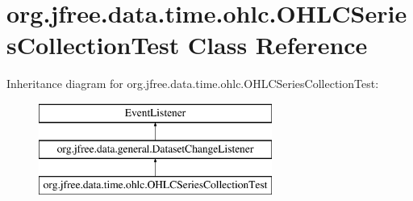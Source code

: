 \hypertarget{classorg_1_1jfree_1_1data_1_1time_1_1ohlc_1_1_o_h_l_c_series_collection_test}{}\section{org.\+jfree.\+data.\+time.\+ohlc.\+O\+H\+L\+C\+Series\+Collection\+Test Class Reference}
\label{classorg_1_1jfree_1_1data_1_1time_1_1ohlc_1_1_o_h_l_c_series_collection_test}
Inheritance diagram for org.\+jfree.\+data.\+time.\+ohlc.\+O\+H\+L\+C\+Series\+Collection\+Test\+:\begin{figure}[H]
\begin{center}
\leavevmode
\includegraphics[height=3.000000cm]{classorg_1_1jfree_1_1data_1_1time_1_1ohlc_1_1_o_h_l_c_series_collection_test}
\end{center}
\end{figure}
